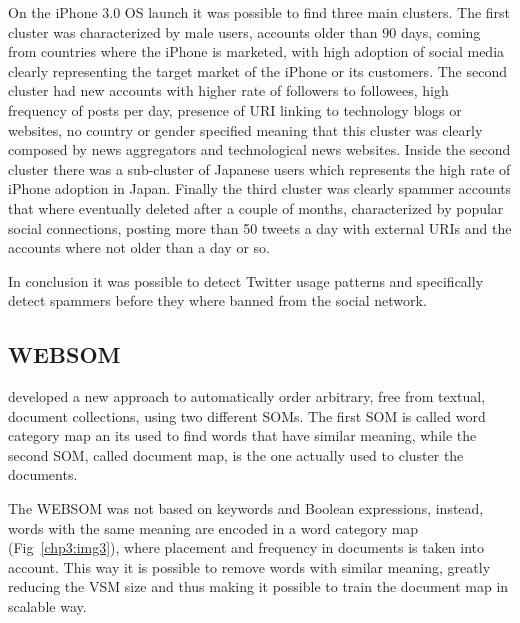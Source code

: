 On the iPhone 3.0 OS launch it was possible to find three main clusters. The first cluster was characterized by male users, accounts older than 90 days, coming from countries where the iPhone is marketed, with high adoption of social media clearly representing the target market of the iPhone or its customers. The second cluster had new accounts with higher rate of followers to followees, high frequency of posts per day, presence of URI linking to technology blogs or websites, no country or gender specified meaning that this cluster was clearly composed by news aggregators and technological news websites. Inside the second cluster there was a sub-cluster of Japanese users which represents the high rate of iPhone adoption in Japan. Finally the third cluster was clearly spammer accounts that where eventually deleted after a couple of months, characterized by popular social connections, posting more than 50 tweets a day with external URIs and the accounts where not older than a day or so.

In conclusion it was possible to detect Twitter usage patterns and specifically detect spammers before they where banned from the social network. 

\subsection{WEBSOM}
\label{sub:websom}
\citet{honkelawebsom} developed a new approach to automatically order arbitrary, free from textual, document collections, using two different SOMs. The first \ac{SOM} is called word category map an its used to find words that have similar meaning, while the second \ac{SOM}, called document map, is the one actually used to cluster the documents. 

The WEBSOM was not based on keywords and Boolean expressions, instead, words with the same meaning are encoded in a word category map (Fig~\ref{chp3:img3}), where placement and frequency in documents is taken into account. This way it is possible to remove words with similar meaning, greatly reducing the \ac{VSM} size and thus making it possible to train the document map in scalable way.
                                                                                                          
